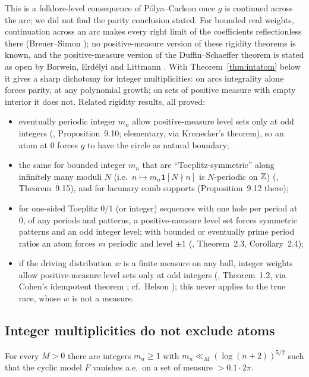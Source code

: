 This is a folklore-level consequence of P\'olya--Carlson once $g$ is continued across the arc; we did not find the parity conclusion stated. For bounded real weights, continuation across an arc makes every right limit of the coefficients reflectionless there (Breuer--Simon \cite[Theorem~1.3]{BS}); no positive-measure version of these rigidity theorems is known, and the positive-measure version of the Duffin--Schaeffer theorem is stated as open by Borwein, Erd\'elyi and Littmann \cite{BEL}. With Theorem~\ref{thm:intatom} below it gives a sharp dichotomy for integer multiplicities: on arcs integrality alone forces parity, at any polynomial growth; on sets of positive measure with empty interior it does not. Related rigidity results, all proved:
\begin{itemize}
\item eventually periodic integer $m_n$ allow positive-measure level sets only at odd integers (, Proposition~9.10; elementary, via Kronecker's theorem), so an atom at $0$ forces $g$ to have the circle as natural boundary; 
\item the same for bounded integer $m_n$ that are ``Toeplitz-symmetric'' along infinitely many moduli $N$ (i.e.\ $n\mapsto m_n\mathbf 1[N\nmid n]$ is $N$-periodic on $\mathbb Z$) (, Theorem~9.15), and for lacunary comb supports (Proposition~9.12 there); 
\item for one-sided Toeplitz $0/1$ (or integer) sequences with one hole per period at $0$, of any periods and patterns, a positive-measure level set forces symmetric patterns and an odd integer level; with bounded or eventually prime period ratios an atom forces $m$ periodic and level $\pm1$ (, Theorem~2.3, Corollary~2.4); 
\item if the driving distribution $w$ is a finite measure on any hull, integer weights allow positive-measure level sets only at odd integers (, Theorem~1.2, via Cohen's idempotent theorem \cite{Cohen}; cf.\ Helson \cite{Helson}); this never applies to the true race, whose $w$ is not a measure. 
\end{itemize}

\subsection{Integer multiplicities do not exclude atoms}\label{sec:intmodels}

\begin{theorem}\label{thm:intatom}
For every $M>0$ there are integers $m_n\ge1$ with $m_n\ll_M(\log(n+2))^{5/2}$ such that the cyclic model $F$ vanishes a.e.\ on a set of measure $>0.1\cdot2\pi$.
\end{theorem}

